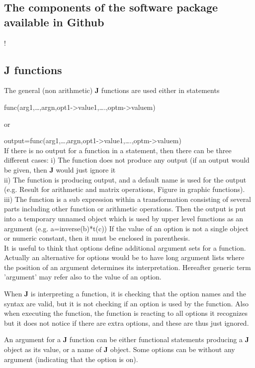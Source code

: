 \subsection{The components of the software package available in Github}
\label{pack}
!
\subsection{\textbf{J} functions}
\label{jfuncs0}
The general (non arithmetic) \textbf{J} functions are used either in statements

func(arg1,…,argn,opt1->value1,….,optm->valuem)

or

output=func(arg1,…,argn,opt1->value1,….,optm->valuem)\\
If there is no output for a function in a statement, then there can be three different cases:
i) The function does not produce any output (if an output would be given, then \textbf{J} would just
ignore it\\
ii) The function is producing output, and a default name is used for the output (e.g. Result
for arithmetic and matrix operations, Figure in graphic functions).\\
iii) The function is a sub expression within a transformation consisting of several parts including
other function or arithmetic operations. Then the output is put into a temporary unnamed
object which is used by upper level functions as an argument (e.g. a=\textcolor{VioletRed}{inverse}(b)*t(c))
If the value of an option is not a single object or numeric constant, then it must be enclosed in
parenthesis.\\
It is useful to think that options define additional argument sets for a function. Actually
an alternative for options would be to have long argument lists where the position of an
argument determines its interpretation. Hereafter generic term 'argument' may refer also to
the value of an option.

When \textbf{J} is interpreting a function, it is checking that the option names and the syntax
are valid, but it is not checking if an option is used by the function. Also when executing the
function, the function is reacting to all options it recognizes but it does not notice if there are
extra options, and these are thus just ignored.

An argument for a \textbf{J} function can be either functional statements producing a \textbf{J} object as its
value, or a name of \textbf{J} object. Some options can be without any argument (indicating that the
option is on).

